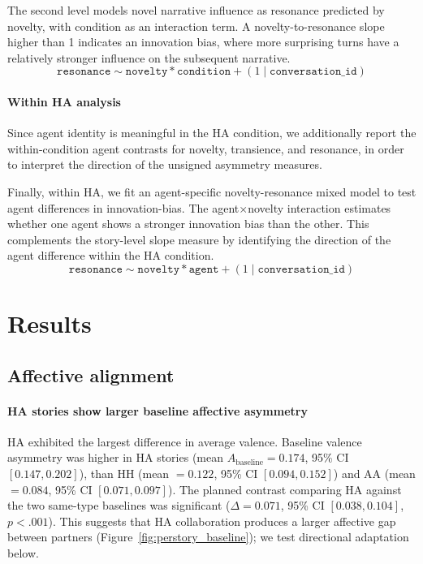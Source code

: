 \documentclass[11pt]{article}
\begin{document}
The second level models novel narrative influence as resonance predicted by novelty, with condition as an interaction term. A novelty-to-resonance slope higher than 1 indicates an innovation bias, where more surprising turns have a relatively stronger influence on the subsequent narrative.
\begin{equation}
\texttt{resonance} \sim \texttt{novelty} * \texttt{condition}
                 + (1 \mid \texttt{conversation\_id})
\end{equation}

\paragraph{Within HA analysis}
Since agent identity is meaningful in the HA condition, we additionally report the within-condition agent contrasts for novelty, transience, and resonance, in order to interpret the direction of the unsigned asymmetry measures.

Finally, within HA, we fit an agent-specific novelty-resonance mixed model to test agent differences in innovation-bias. The agent$\times$novelty interaction estimates whether one agent shows a stronger innovation bias than the other. This complements the story-level slope measure by identifying the direction of the agent difference within the HA condition.
\begin{equation}
    \texttt{resonance} \sim \texttt{novelty} * \texttt{agent}+ (1 \mid \texttt{conversation\_id})
\end{equation}

\section{Results}
\subsection{Affective alignment}
\paragraph{HA stories show larger baseline affective asymmetry}
HA exhibited the largest difference in average valence. Baseline valence asymmetry was higher in HA stories (mean $A_{\mathrm{baseline}}=0.174$, 95\% CI $[0.147,0.202]$), than HH (mean $=0.122$, 95\% CI $[0.094,0.152]$) and AA (mean $=0.084$, 95\% CI $[0.071,0.097]$). The planned contrast comparing HA against the two same-type baselines was significant ($\Delta=0.071$, 95\% CI $[0.038,0.104]$, $p<.001$).
This suggests that HA collaboration produces a larger affective gap between partners (Figure~\ref{fig:perstory_baseline}); we test directional adaptation below. 
\end{document}
